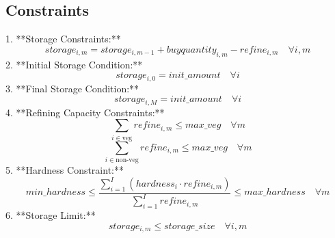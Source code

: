 \documentclass{article}
\begin{document}
\subsection*{Constraints}
1. **Storage Constraints:**
\[
storage_{i,m} = storage_{i,m-1} + buyquantity_{i,m} - refine_{i,m} \quad \forall i, m
\]
2. **Initial Storage Condition:**
\[
storage_{i,0} = init\_amount \quad \forall i
\]
3. **Final Storage Condition:**
\[
storage_{i,M} = init\_amount \quad \forall i
\]
4. **Refining Capacity Constraints:**
\[
\sum_{i \in \text{veg}} refine_{i,m} \leq max\_veg \quad \forall m
\]
\[
\sum_{i \in \text{non-veg}} refine_{i,m} \leq max\_veg \quad \forall m
\]
5. **Hardness Constraint:**
\[
min\_hardness \leq \frac{\sum_{i=1}^{I} (hardness_{i} \cdot refine_{i,m})}{\sum_{i=1}^{I} refine_{i,m}} \leq max\_hardness \quad \forall m
\]
6. **Storage Limit:**
\[
storage_{i,m} \leq storage\_size \quad \forall i, m
\]
\end{document}
